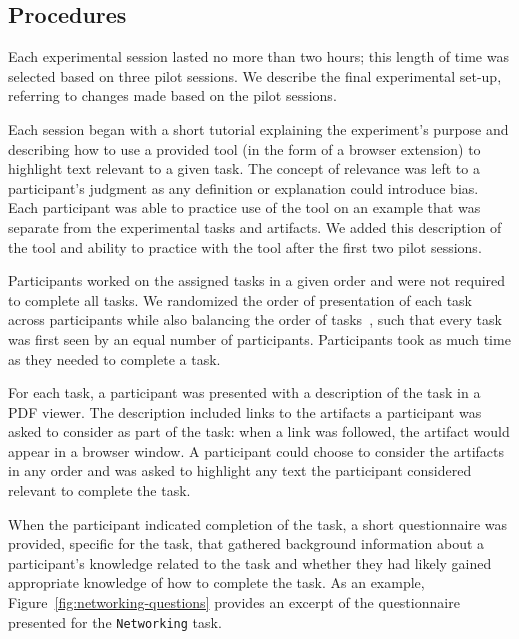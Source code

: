 \subsection{Procedures}
\label{cp3:procedures}



Each experimental session lasted no more than two hours; this length
of time was selected based on three pilot sessions.
We describe the final experimental set-up, referring to
changes made based on the pilot sessions.



Each session began with a short tutorial explaining the
experiment's purpose and describing how to use a provided tool (in
the form of a browser extension) to
highlight text relevant to a given task.
The concept of relevance was left to a participant's judgment as any
definition or explanation could introduce bias.
Each participant was able to practice use of the
tool on an example that was separate from the experimental tasks and
artifacts. We added this description of the tool and ability to 
practice with the tool after the first two pilot sessions. 


Participants worked on the assigned tasks in a given order and were
not required to complete all tasks.
We randomized the order of presentation of each task across
participants while also balancing the order of tasks~\cite{wohlin2012},
such that every task was first seen by an equal number of participants. 
Participants took as much time as they needed to complete a task.


For each task, a participant was presented with a description of the task in a PDF
viewer. The description included links to the artifacts a participant
was asked to consider as part of the task: when a link was followed,
the artifact would appear in a browser window.
A participant could choose to
consider the artifacts in any order and was asked to highlight any
text the participant considered relevant to complete the task.




When the participant
indicated completion of the task, a short questionnaire was
provided, specific for the task, that gathered background
information about a participant's knowledge related to the task
and whether they had likely gained appropriate knowledge
of how to complete the task. 
As an example, Figure~\ref{fig:networking-questions} provides an 
excerpt of the questionnaire presented for the \texttt{Networking} task.


